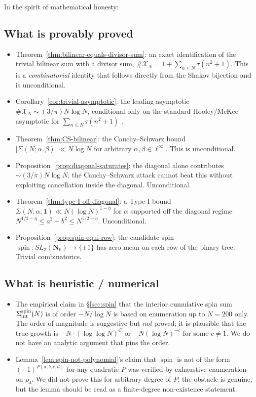 \documentclass[11pt]{article}
\theoremstyle{definition}
\newcommand{\Nz}{\mathbf{N}_0}
\newcommand{\SLNz}{SL_2(\Nz)}
\DeclareMathOperator{\spin}{spin}
\begin{document}
In the spirit of mathematical honesty:

\subsection*{What is provably proved}

\begin{itemize}
\item Theorem~\ref{thm:bilinear-equals-divisor-sum}: an exact
identification of the trivial bilinear sum with a divisor sum,
$\#\mathcal{X}_{N}=1+\sum_{n\le N}\tau(n^{2}+1)$. This is a
\emph{combinatorial} identity that follows directly from the Shakov
bijection \cite[Thm.~4.2]{shakov} and is unconditional.
\item Corollary~\ref{cor:trivial-asymptotic}: the leading asymptotic
$\#\mathcal{X}_{N}\sim(3/\pi)N\log N$, conditional only on the standard
Hooley/McKee asymptotic for $\sum_{n\le N}\tau(n^{2}+1)$
\cite{hooley63,mckee99}.
\item Theorem~\ref{thm:CS-bilinear}: the Cauchy--Schwarz bound
$|\Sigma(N;\alpha,\beta)|\ll N\log N$ for arbitrary
$\alpha,\beta\in\ell^{\infty}$. This is unconditional.
\item Proposition~\ref{prop:diagonal-saturates}: the diagonal alone
contributes $\sim(3/\pi)N\log N$; the Cauchy--Schwarz attack cannot
beat this without exploiting cancellation inside the diagonal.
Unconditional.
\item Theorem~\ref{thm:type-I-off-diagonal}: a Type-I bound
$\Sigma(N;\alpha,\mathbf{1})\ll N(\log N)^{1-\eta}$ for $\alpha$
supported off the diagonal regime
$N^{1/2-\eta}\le a^{2}+b^{2}\le N^{1/2+\eta}$.
Unconditional.
\item Proposition~\ref{prop:spin-equi-row}: the candidate spin
$\spin:\SLNz\to\{\pm 1\}$ has zero mean on each row of the binary tree.
Trivial combinatorics.
\end{itemize}

\subsection*{What is heuristic / numerical}

\begin{itemize}
\item The empirical claim in \S\ref{sec:spin} that the interior
cumulative spin sum $\Sigma_{\textnormal{int}}^{\spin}(N)$ is of order
$-N/\log N$ is based on enumeration up to $N=200$ only. The order of
magnitude is suggestive but \emph{not} proved; it is plausible that the
true growth is $-N\cdot(\log\log N)^{C}$ or $-N(\log N)^{-c}$ for some
$c\ne 1$. We do not have an analytic argument that pins the order.
\item Lemma~\ref{lem:spin-not-polynomial}'s claim that $\spin$ is not
of the form $(-1)^{P(a,b,c,d)}$ for any quadratic $P$ was verified by
exhaustive enumeration on $\rho_{4}$. We did not prove this for
arbitrary degree of $P$; the obstacle is genuine, but the lemma should
be read as a finite-degree non-existence statement.
\end{itemize}
\end{document}
